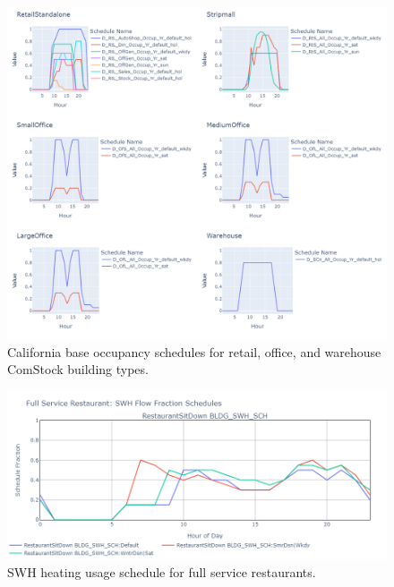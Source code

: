 \begin{figure}
    \centering
    \includegraphics[trim={0 0 0 0}, clip,  %
    width=\textwidth]{figures/occupancy_schedules_deer_2.png}
    \caption[California base occupancy schedules continued]{California base occupancy schedules for retail, office, and warehouse ComStock building types.}
    \label{fig:occupancy_schedules_deer_2}
\end{figure}

\begin{figure}
  \centering
  \includegraphics[width=\textwidth]{figures/swh_sched_full service restaurant.png}
  \caption[SWH heating usage schedule for full service restaurants]{SWH heating usage schedule for full service restaurants.}
  \label{fig:swh_sched_fsr}
\end{figure}

